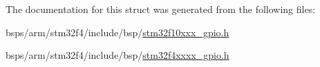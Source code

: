 The documentation for this struct was generated from the following files\+:\begin{DoxyCompactItemize}
\item 
bsps/arm/stm32f4/include/bsp/\mbox{\hyperlink{stm32f10xxx__gpio_8h}{stm32f10xxx\+\_\+gpio.\+h}}\item 
bsps/arm/stm32f4/include/bsp/\mbox{\hyperlink{stm32f4xxxx__gpio_8h}{stm32f4xxxx\+\_\+gpio.\+h}}\end{DoxyCompactItemize}
